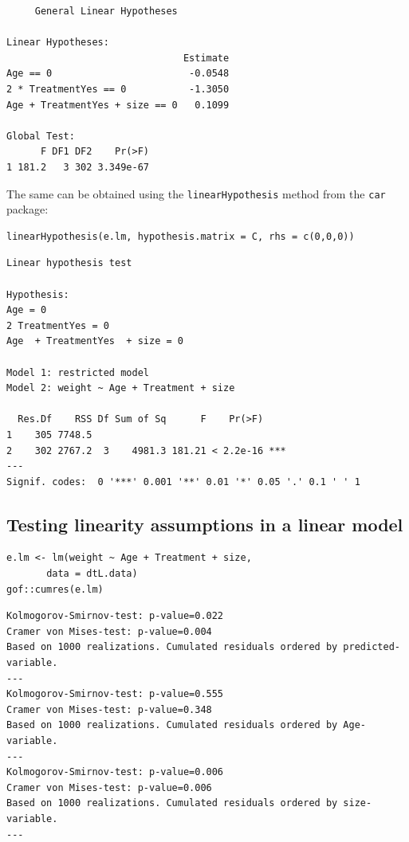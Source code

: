\documentclass{article}
\begin{document}
\begin{verbatim}
	 General Linear Hypotheses

Linear Hypotheses:
                               Estimate
Age == 0                        -0.0548
2 * TreatmentYes == 0           -1.3050
Age + TreatmentYes + size == 0   0.1099

Global Test:
      F DF1 DF2    Pr(>F)
1 181.2   3 302 3.349e-67
\end{verbatim}

The same can be obtained using the \texttt{linearHypothesis} method from the \texttt{car} package:
\lstset{language=r,label= ,caption= ,captionpos=b,numbers=none}
\begin{lstlisting}
linearHypothesis(e.lm, hypothesis.matrix = C, rhs = c(0,0,0))
\end{lstlisting}

\begin{verbatim}
Linear hypothesis test

Hypothesis:
Age = 0
2 TreatmentYes = 0
Age  + TreatmentYes  + size = 0

Model 1: restricted model
Model 2: weight ~ Age + Treatment + size

  Res.Df    RSS Df Sum of Sq      F    Pr(>F)    
1    305 7748.5                                  
2    302 2767.2  3    4981.3 181.21 < 2.2e-16 ***
---
Signif. codes:  0 '***' 0.001 '**' 0.01 '*' 0.05 '.' 0.1 ' ' 1
\end{verbatim}

\subsection{Testing linearity assumptions in a linear model}
\label{sec:org7947ee0}
\lstset{language=r,label= ,caption= ,captionpos=b,numbers=none}
\begin{lstlisting}
e.lm <- lm(weight ~ Age + Treatment + size,
	   data = dtL.data)
gof::cumres(e.lm)
\end{lstlisting}

\begin{verbatim}
Kolmogorov-Smirnov-test: p-value=0.022
Cramer von Mises-test: p-value=0.004
Based on 1000 realizations. Cumulated residuals ordered by predicted-variable.
---
Kolmogorov-Smirnov-test: p-value=0.555
Cramer von Mises-test: p-value=0.348
Based on 1000 realizations. Cumulated residuals ordered by Age-variable.
---
Kolmogorov-Smirnov-test: p-value=0.006
Cramer von Mises-test: p-value=0.006
Based on 1000 realizations. Cumulated residuals ordered by size-variable.
---
\end{verbatim}
\end{document}
